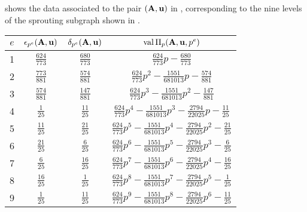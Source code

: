 \documentclass{amsart}
\begin{document}
\begin{example}
   \label{ex: new example.2}
    shows the data associated to the pair $(\mathbf{A},\mathbf{u})$ in , corresponding to the nine levels of the sprouting subgraph shown in .
   \begin{table}
      \begin{center}
         \begingroup
         \setlength{\tabcolsep}{8pt} %
         \renewcommand{\arraystretch}{1.4} %
         \begin{tabular}{cccc}
           \toprule
           $e$ & $\epsilon_{p^e}(\mathbf{A},\mathbf{u})$ & $\delta_{p^e}(\mathbf{A},\mathbf{u})$ & $\operatorname{val}\Pi_p(\mathbf{A},\mathbf{u},p^e)$ \\
           \midrule
           1 & $\frac{624}{773}$ & $\frac{680}{773}$ & $\frac{624}{773}p - \frac{680}{773}$\\
           2 & $\frac{773}{881}$ & $\frac{574}{881}$ & $\frac{624}{773}p^2 - \frac{\num{1551}}{\num{681013}}p - \frac{574}{881}$ \\
           3 & $\frac{574}{881}$ & $\frac{147}{881}$ & $\frac{624}{773}p^3 - \frac{\num{1551}}{\num{681013}}p^2 - \frac{147}{881}$ \\
           4 & $\frac{1}{25}$ & $\frac{11}{25}$ & $\frac{624}{773}p^4 - \frac{\num{1551}}{\num{681013}}p^3 - \frac{\num{2794}}{\num{22025}}p - \frac{11}{25}$ \\
           5 & $\frac{11}{25}$ & $\frac{21}{25}$ & $\frac{624}{773}p^5 - \frac{\num{1551}}{\num{681013}}p^4 - \frac{\num{2794}}{\num{22025}}p^2 - \frac{21}{25}$ \\
           6 & $\frac{21}{25}$ & $\frac{6}{25}$ & $\frac{624}{773}p^6 - \frac{\num{1551}}{\num{681013}}p^5 - \frac{\num{2794}}{\num{22025}}p^3 - \frac{6}{25}$ \\
           7 & $\frac{6}{25}$ & $\frac{16}{25}$ & $\frac{624}{773}p^7 - \frac{\num{1551}}{\num{681013}}p^6 - \frac{\num{2794}}{\num{22025}}p^4 - \frac{16}{25}$ \\
           8 & $\frac{16}{25}$ & $\frac{1}{25}$ & $\frac{624}{773}p^8 - \frac{\num{1551}}{\num{681013}}p^7 - \frac{\num{2794}}{\num{22025}}p^5 - \frac{1}{25}$ \\
           9 & $\frac{1}{25}$ & $\frac{11}{25}$ & $\frac{624}{773}p^9 - \frac{\num{1551}}{\num{681013}}p^8 - \frac{\num{2794}}{\num{22025}}p^6 - \frac{11}{25}$ \\
           \bottomrule

\end{tabular}
\end{center}
\end{table}
\end{example}
\end{document}
